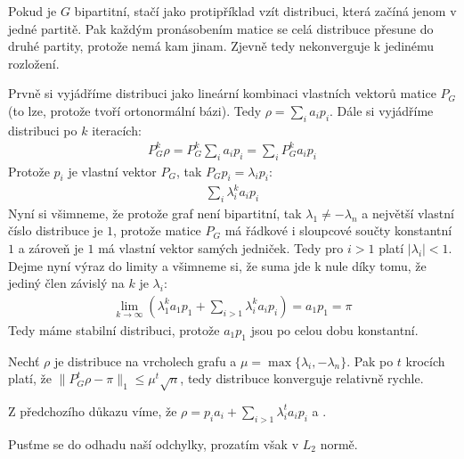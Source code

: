 \dk \begin{description}
	\item \uv{$\Rightarrow$} Pokud je $G$ bipartitní, stačí jako protipříklad vzít distribuci, která začíná jenom v jedné partitě. Pak každým pronásobením matice se celá distribuce přesune do druhé partity, protože nemá kam jinam. Zjevně tedy nekonverguje k jedinému rozložení.
	\item \uv{$\Leftarrow$} Prvně si vyjádříme distribuci jako lineární kombinaci vlastních vektorů matice $P_G$ (to lze, protože tvoří ortonormální bázi). Tedy $\rho = \sum_i a_ip_i$. Dále si vyjádříme distribuci po $k$ iteracích:
	\begin{align}
		P_G^k\rho = P_G^k\sum_ia_ip_i = \sum_iP_G^ka_ip_i
	\end{align}
	Protože $p_i$ je vlastní vektor $P_G$, tak $P_Gp_i = \lambda_ip_i$:
	\begin{align}
		\sum_i\lambda_i^ka_ip_i
	\end{align}
	Nyní si všimneme, že protože graf není bipartitní, tak $\lambda_1 \neq -\lambda_n$ a největší vlastní číslo distribuce je $1$, protože matice $P_G$ má řádkové i sloupcové součty konstantní $1$ a zároveň je $1$ má vlastní vektor samých jedniček. Tedy pro $i > 1$ platí $|\lambda_i| < 1$. Dejme nyní výraz do limity a všimneme si, že suma jde k nule díky tomu, že jediný člen závislý na $k$ je $\lambda_i$:
	\begin{align}
		\lim_{k\to \infty}\left(\lambda_1^ka_1p_1 + \sum_{i>1}\lambda_i^ka_ip_i\right) = a_1p_1 = \pi
	\end{align}
	Tedy máme stabilní distribuci, protože $a_1p_1$ jsou po celou dobu konstantní.
\end{description}

\vt Nechť $\rho$ je distribuce na vrcholech grafu a $\mu=\max\{\lambda_i,-\lambda_n\}$. Pak po $t$ krocích platí, že $\|P_G^t\rho - \pi\|_1 \leq \mu^t\sqrt{n}$, tedy distribuce konverguje relativně rychle.

\dk Z předchozího důkazu víme, že $\rho = p_ia_i + \sum_{i>1} \lambda_i^ta_ip_i$ a .

Pusťme se do odhadu naší odchylky, prozatím však v $L_2$ normě.

